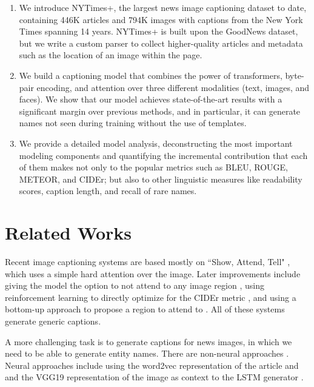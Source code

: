 \documentclass[10pt,twocolumn,letterpaper]{article}
\begin{document}
\begin{enumerate}
   \item We introduce NYTimes+, the largest news image captioning dataset to
   date, containing 446K articles and 794K images with captions from the New
   York Times spanning 14 years. NYTimes+ is built upon the GoodNews dataset,
   but we write a custom parser to collect higher-quality articles and metadata
   such as the location of an image within the page.

   \item We build a captioning model that combines the power of transformers,
   byte-pair encoding, and attention over three different modalities (text,
   images, and faces). We show that our model achieves state-of-the-art results
   with a significant margin over previous methods, and in particular, it can
   generate names not seen during training without the use of templates.

   \item We provide a detailed model analysis, deconstructing the most
   important modeling components and quantifying the incremental contribution
   that each of them makes not only to the popular metrics such as BLEU, ROUGE,
   METEOR, and CIDEr; but also to other linguistic measures like readability
   scores, caption length, and recall of rare names.
\end{enumerate}


\section{Related Works}

Recent image captioning systems are based mostly on ``Show, Attend, Tell"
\cite{Xu2015ShowAA}, which uses a simple hard attention over the image. Later
improvements include giving the model the option to not attend to any image
region \cite{Lu2017KnowingWT}, using reinforcement learning to directly
optimize for the CIDEr metric \cite{Rennie2017SelfCriticalST}, and using a
bottom-up approach to propose a region to attend to
\cite{Anderson2017BottomUpAT}. All of these systems generate generic captions.

A more challenging task is to generate captions for news images, in which we
need to be able to generate entity names. There are non-neural approaches
\cite{Feng2013AutomaticCG,Tariq2017ACE}. Neural approaches include using the
word2vec representation of the article and and the VGG19 representation of the
image as context to the LSTM generator \cite{Ramisa2016BreakingNewsAA}.
\end{document}
